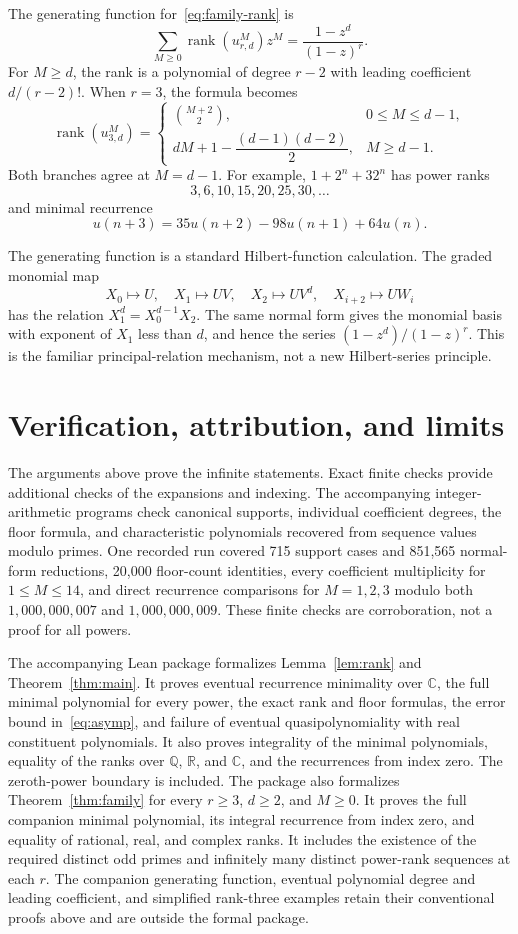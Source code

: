 \documentclass[11pt,a4paper]{article}
\newcommand{\rank}{\operatorname{rank}}
\newcommand{\CC}{\mathbb C}
\newcommand{\QQ}{\mathbb Q}
\begin{document}
The generating function for~\eqref{eq:family-rank} is
\[
 \sum_{M\ge0}\rank(u_{r,d}^M)z^M=\frac{1-z^d}{(1-z)^r}.
\]
For $M\ge d$, the rank is a polynomial of degree $r-2$ with leading coefficient
$d/(r-2)!$. When $r=3$, the formula becomes
\[
 \rank(u_{3,d}^M)=
 \begin{cases}
 \binom{M+2}{2},&0\le M\le d-1,\\[2pt]
 dM+1-\dfrac{(d-1)(d-2)}2,&M\ge d-1.
 \end{cases}
\]
Both branches agree at $M=d-1$. For example, $1+2^n+32^n$ has power ranks
\[
 3,6,10,15,20,25,30,\ldots
\]
and minimal recurrence
\[
 u(n+3)=35u(n+2)-98u(n+1)+64u(n).
\]

The generating function is a standard Hilbert-function calculation.
The graded monomial map
\[
 X_0\mapsto U,\quad X_1\mapsto UV,\quad X_2\mapsto UV^d,
 \quad X_{i+2}\mapsto UW_i
\]
has the relation $X_1^d=X_0^{d-1}X_2$.
The same normal form gives the monomial basis with exponent of $X_1$ less
than $d$, and hence the series $(1-z^d)/(1-z)^r$.
This is the familiar principal-relation mechanism, not a new Hilbert-series principle.

\section{Verification, attribution, and limits}
The arguments above prove the infinite statements. Exact finite checks
provide additional checks of the expansions and indexing.
The accompanying integer-arithmetic programs check canonical supports,
individual coefficient degrees, the floor formula, and characteristic
polynomials recovered from sequence values modulo primes.
One recorded run covered 715 support cases and 851,565 normal-form reductions,
20,000 floor-count identities, every coefficient multiplicity for $1\le M\le14$,
and direct recurrence comparisons for $M=1,2,3$ modulo both
$1{,}000{,}000{,}007$ and $1{,}000{,}000{,}009$.
These finite checks are corroboration, not a proof for all powers.

The accompanying Lean package formalizes Lemma~\ref{lem:rank} and
Theorem~\ref{thm:main}. It proves eventual recurrence minimality over
$\CC$, the full minimal polynomial for every power, the exact rank and
floor formulas, the error bound in~\eqref{eq:asymp}, and failure of eventual
quasipolynomiality with real constituent polynomials. It also proves
integrality of the minimal polynomials, equality of the ranks over
$\QQ$, $\mathbb R$, and $\CC$, and the recurrences from index zero.
The zeroth-power boundary is included.
The package also formalizes Theorem~\ref{thm:family} for every $r\ge3$,
$d\ge2$, and $M\ge0$. It proves the full companion minimal polynomial,
its integral recurrence from index zero, and equality of rational, real,
and complex ranks. It includes the existence of the required distinct
odd primes and infinitely many distinct power-rank sequences at each $r$.
The companion generating function, eventual polynomial degree and leading
coefficient, and simplified rank-three examples retain their conventional
proofs above and are outside the formal package.
\end{document}

